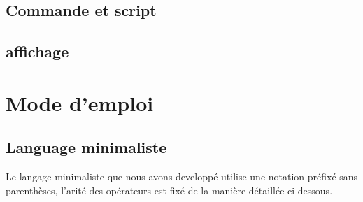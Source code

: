 \documentclass[a4paper, 11pt]{article}
\begin{document}
\subsection{Commande et script}

\subsection{affichage}


\newpage
\section{Mode d'emploi}
\subsection{Language minimaliste}
Le langage minimaliste que nous avons developpé utilise une notation préfixé sans parenthèses, l'arité des opérateurs est fixé de la manière détaillée ci-dessous.\\\\
\end{document}
